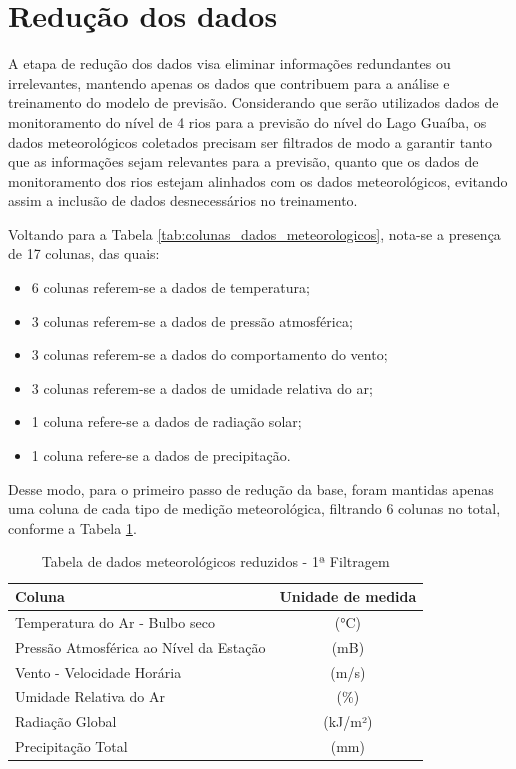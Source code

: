 \section{Redução dos dados}
\label{sec:reducao_dados}

A etapa de redução dos dados visa eliminar informações redundantes ou irrelevantes, mantendo apenas os dados que contribuem para a análise e treinamento do modelo de previsão. Considerando que serão utilizados dados de monitoramento do nível de 4 rios para a previsão do nível do Lago Guaíba, os dados meteorológicos coletados precisam ser filtrados de modo a garantir tanto que as informações sejam relevantes para a previsão, quanto que os dados de monitoramento dos rios estejam alinhados com os dados meteorológicos, evitando assim a inclusão de dados desnecessários no treinamento. 

Voltando para a Tabela \ref{tab:colunas_dados_meteorologicos}, nota-se a presença de 17 colunas, das quais:

\begin{itemize}
	\item 6 colunas referem-se a dados de temperatura;
	\item 3 colunas referem-se a dados de pressão atmosférica;
	\item 3 colunas referem-se a dados do comportamento do vento;
	\item 3 colunas referem-se a dados de umidade relativa do ar;
	\item 1 coluna refere-se a dados de radiação solar;
	\item 1 coluna refere-se a dados de precipitação.
\end{itemize}

Desse modo, para o primeiro passo de redução da base, foram mantidas apenas uma coluna de cada tipo de medição meteorológica, filtrando 6 colunas no total, conforme a Tabela \ref{tab:colunas_dados_meteorologicos_reduzidas}. 

\begin{table}[H]
	\centering
	\begin{tabular}{|p{10cm}|c|}
	\hline
	\textbf{Coluna} & \textbf{Unidade de medida} \\
	\hline
	Temperatura do Ar - Bulbo seco & (°C) \\
	Pressão Atmosférica ao Nível da Estação & (mB) \\
	Vento - Velocidade Horária & (m/s) \\
	Umidade Relativa do Ar & (\%) \\
	Radiação Global & (kJ/m²) \\
	Precipitação Total & (mm) \\
	\hline
	\end{tabular}
	\caption{Tabela de dados meteorológicos reduzidos - 1ª Filtragem}
	\label{tab:colunas_dados_meteorologicos_reduzidas}
\end{table}

